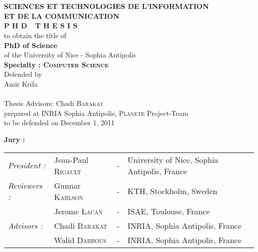 \begin{titlepage}
\begin{center}
 \\
\vspace*{0.3cm}
 \\
\noindent \textbf{SCIENCES ET TECHNOLOGIES DE L'INFORMATION \\ ET DE LA COMMUNICATION} \\
\vspace*{0.5cm}
\noindent \Huge \textbf{P H D\ \ T H E S I S} \\
\vspace*{0.3cm}
\noindent \large {to obtain the title of} \\
\vspace*{0.3cm}
\noindent \LARGE \textbf{PhD of Science} \\
\vspace*{0.3cm}
\noindent \Large of the University of Nice - Sophia Antipolis \\
\noindent \Large \textbf{Specialty : \textsc{Computer Science}}\\
\vspace*{0.4cm}
\noindent \large {Defended by\\}
\noindent \LARGE Amir Krifa \\
\vspace*{0.8cm}
 \\
\vspace*{0.8cm}
\noindent \Large Thesis Advisors: Chadi \textsc{Barakat} \\
\vspace*{0.2cm}
\noindent \Large prepared at INRIA Sophia Antipolis, \textsc{Planete} Project-Team\\
\vspace*{0.2cm}
\noindent \large to be defended on December 1, 2011 \\
\vspace*{0.5cm}
\end{center}
\noindent \large \textbf{Jury :} \\
\begin{center}
\noindent \large 
\begin{tabular}{llcl}
 \textit{President :}	& Jean-Paul \textsc{Rigault}		& - & University of Nice, Sophia Antipolis, France\\
      \textit{Reviewers :}	& Gunnar \textsc{Karlson}	& - & KTH, Stockholm, Sweden\\
				& Jerome \textsc{Lacan}		& - & ISAE, Toulouse, France\\
      \textit{Advisors :}	& Chadi \textsc{Barakat}	& - & INRIA, Sophia Antipolis, France\\
                                & Walid \textsc{Dabbous}	& - & INRIA, Sophia Antipolis, France\\


\end{tabular}
\end{center}
\end{titlepage}
